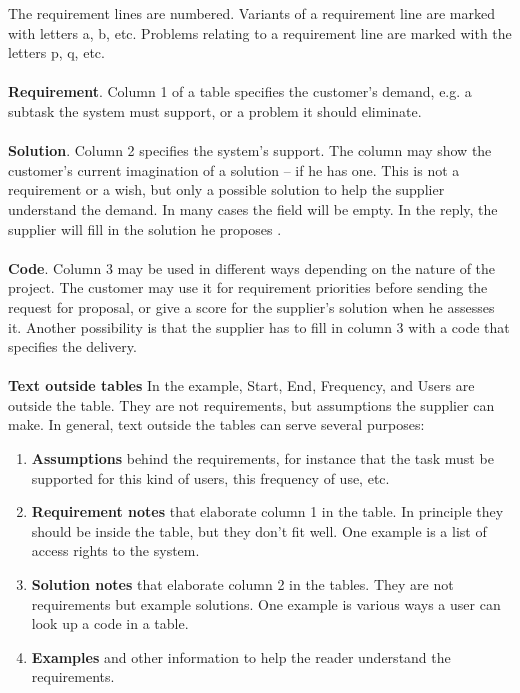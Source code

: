 \documentclass[Main]{subfiles}
\begin{document}
The requirement lines are numbered. 
Variants of a requirement line are marked with letters a, b, etc. 
Problems relating to a requirement line are marked with the letters p, q, etc. 
\\
\\
\textbf{Requirement}. 
Column 1 of a table specifies the customer's demand, e.g. a subtask the system must support, or a problem it should eliminate. 
\\
\\
\textbf{Solution}. 
Column 2 specifies the system's support. 
The column may show the customer's current imagination of a solution -- if he has one. 
This is not a requirement or a wish, but only a possible solution to help the supplier understand the demand. 
In many cases the field will be empty. 
In the reply, the supplier will fill in the solution he proposes .
\\
\\
\textbf{Code}. 
Column 3 may be used in different ways depending on the nature of the project. 
The customer may use it for requirement priorities before sending the request for proposal, or give a score for the supplier's solution when he assesses it. 
Another possibility is that the supplier has to fill in column 3 with a code that specifies the delivery.
\\
\\
\textbf{Text outside tables}
In the example, Start, End, Frequency, and Users are outside the table. 
They are not requirements, but assumptions the supplier can make. 
In general, text outside the tables can serve several purposes:

\begin{enumerate}[A]
\item \textbf{Assumptions} behind the requirements, for instance that the task must be supported for this kind of users, this frequency of use, etc.

\item \textbf{Requirement notes} that elaborate column 1 in the table. 
In principle they should be inside the table, but they don't fit well. 
One example is a list of access rights to the system.

\item \textbf{Solution notes} that elaborate column 2 in the tables. 
They are not requirements but example solutions. 
One example is various ways a user can look up a code in a table.

\item \textbf{Examples} and other information to help the reader understand the requirements.
\end{enumerate}
\end{document}
